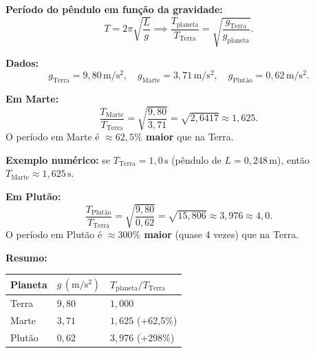 \textbf{Período do pêndulo em função da gravidade:}
\[
T=2\pi\sqrt{\frac{L}{g}}\implies \frac{T_{\text{planeta}}}{T_{\text{Terra}}}=\sqrt{\frac{g_{\text{Terra}}}{g_{\text{planeta}}}}.
\]

\textbf{Dados:}
\[
g_{\text{Terra}}=9{,}80\,\mathrm{m/s^2},\quad g_{\text{Marte}}=3{,}71\,\mathrm{m/s^2},\quad g_{\text{Plutão}}=0{,}62\,\mathrm{m/s^2}.
\]

\textbf{Em Marte:}
\[
\frac{T_{\text{Marte}}}{T_{\text{Terra}}}=\sqrt{\frac{9{,}80}{3{,}71}}=\sqrt{2{,}6417}\approx1{,}625.
\]
O período em Marte é \textbf{$\approx62{,}5\%$ maior} que na Terra.

\textbf{Exemplo numérico:} se $T_{\text{Terra}}=1{,}0\,\mathrm{s}$ (pêndulo de $L=0{,}248\,\mathrm{m}$), então $T_{\text{Marte}}\approx1{,}625\,\mathrm{s}$.

\textbf{Em Plutão:}
\[
\frac{T_{\text{Plutão}}}{T_{\text{Terra}}}=\sqrt{\frac{9{,}80}{0{,}62}}=\sqrt{15{,}806}\approx3{,}976\approx4{,}0.
\]
O período em Plutão é \textbf{$\approx300\%$ maior} (quase 4 vezes) que na Terra.

\textbf{Resumo:}
\begin{center}
\begin{tabular}{lll}
\hline
Planeta & $g\,(\mathrm{m/s^2})$ & $T_{\text{planeta}}/T_{\text{Terra}}$ \\
\hline
Terra & $9{,}80$ & $1{,}000$ \\
Marte & $3{,}71$ & $1{,}625$ (+62{,}5\%) \\
Plutão & $0{,}62$ & $3{,}976$ (+298\%) \\
\hline
\end{tabular}
\end{center}